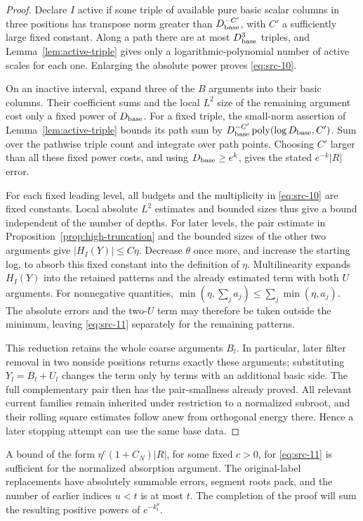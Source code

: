 \begin{proof}
Declare $I$ active if some triple of available
pure basic scalar columns in three positions
has transpose norm greater than
$D_{\rm base}^{-C'}$, with $C'$ a sufficiently
large fixed constant.  Along a path there
are at most $D_{\rm base}^3$ triples, and
Lemma~\ref{lem:active-triple} gives only a
logarithmic-polynomial number of active
scales for each one.  Enlarging the absolute
power proves \eqref{eq:src-10}.

On an inactive interval, expand three of
the $B$ arguments into their basic columns.
Their coefficient sums and the local $L^2$
size of the remaining argument cost only
a fixed power of $D_{\rm base}$.  For a
fixed triple, the small-norm assertion of
Lemma~\ref{lem:active-triple} bounds its
path sum by
$D_{\rm base}^{-C'}
 \operatorname{poly}(\log D_{\rm base},C')$.
Sum over the pathwise triple count and
integrate over path points.  Choosing
$C'$ larger than all these fixed power
costs, and using $D_{\rm base}\ge e^k$,
gives the stated $e^{-k}|R|$ error.

For each fixed leading level, all budgets
and the multiplicity in \eqref{eq:src-10}
are fixed constants.  Local absolute
$L^2$ estimates and bounded sizes thus
give a bound independent of the number
of depths.  For later levels, the pair
estimate in
Proposition~\ref{prop:high-truncation}
and the bounded sizes of the other two
arguments give $|H_I(Y)|\le C\eta$.
Decrease $\theta$ once more, and increase
the starting log, to absorb this fixed
constant into the definition of $\eta$.
Multilinearity expands $H_I(Y)$ into
the retained patterns and the already
estimated term with both $U$ arguments.
For nonnegative quantities,
$\min(\eta,\sum_j a_j)\le
\sum_j\min(\eta,a_j)$.  The absolute
errors and the two-$U$ term may therefore
be taken outside the minimum, leaving
\eqref{eq:src-11} separately for the
remaining patterns.

This reduction retains the whole coarse
arguments $B_l$.  In particular, later
filter removal in two nonside positions
returns exactly these arguments;
substituting $Y_l=B_l+U_l$ changes the
term only by terms with an additional
basic side.  The full complementary
pair then has the pair-smallness already
proved.  All relevant current families
remain inherited under restriction to
a normalized subroot, and their rolling
square estimates follow anew from
orthogonal energy there.  Hence a later
stopping attempt can use the same base
data.
\end{proof}

A bound of the form
$\eta^c(1+C_N)|R|$, for some fixed $c>0$,
for \eqref{eq:src-11} is sufficient for
the normalized absorption argument.
The original-label replacements have
absolutely summable errors, segment
roots pack, and the number of earlier
indices $u<t$ is at most $t$.  The
completion of the proof will sum the
resulting positive powers of
$e^{-k_t^\theta}$.
